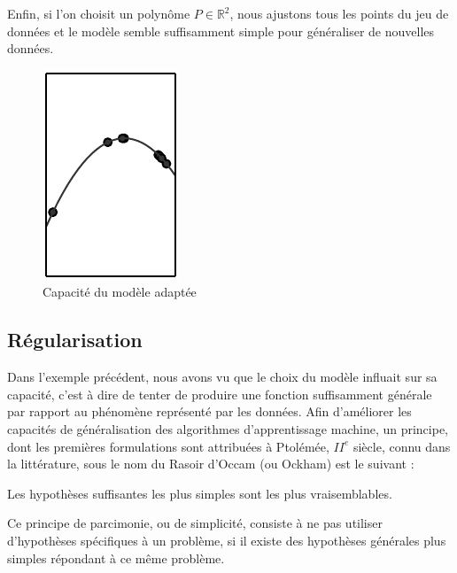 \documentclass[a4paper, 10pt]{report}
\begin{document}
Enfin, si l'on choisit un polynôme $P \in \mathbb{R}^2$, nous ajustons tous les points du jeu de données et le modèle semble suffisamment simple pour généraliser de nouvelles données.
\begin{figure}[H]
	\begin{center}
		\includegraphics[scale=0.5]{Images/Good_Fitting.png}
		\caption{Capacité du modèle adaptée}
	\end{center}
\end{figure}
		
\subsection{Régularisation}
Dans l'exemple précédent, nous avons vu que le choix du modèle influait sur sa capacité, c'est à dire de tenter de produire une fonction suffisamment générale par rapport au phénomène représenté par les données.
Afin d'améliorer les capacités de généralisation des algorithmes d'apprentissage machine, un principe, dont les premières formulations sont attribuées à Ptolémée, $II^e$ siècle, connu dans la littérature, sous le nom du Rasoir d'Occam (ou Ockham) est le suivant : 
\begin{displayquote}
	Les hypothèses suffisantes les plus simples sont les plus vraisemblables.
\end{displayquote}
Ce principe de parcimonie, ou de simplicité, consiste à ne pas utiliser d'hypothèses spécifiques à un problème, si il existe des hypothèses générales plus simples répondant à ce même problème.
\end{document}
